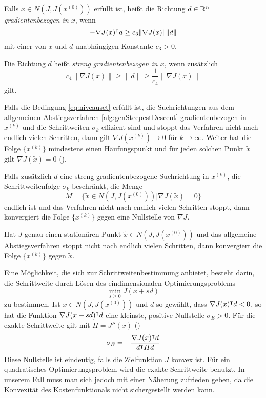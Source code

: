Falls $x\in N(J,J(x^{(0)}))$ erfüllt ist, heißt die Richtung $d\in \mathbb{R}^n$ \textit{gradientenbezogen in $x$}, wenn
 \[
  -\nabla J(x)^\intercal d\geq c_3\|\nabla J(x)\| \|d\|
 \]
mit einer von $x$ und $d$ unabhängigen Konstante $c_3>0$.

Die Richtung $d$ heißt \textit{streng gradientenbezogen in $x$}, wenn zusätzlich 
\[
 c_4\|\nabla J(x)\| \geq \|d\| \geq \frac{1}{c_4}\|\nabla J(x)\| 
\]
gilt.

Falls die Bedingung \eqref{eq:niveauset} erfüllt ist, die Suchrichtungen aus dem allgemeinen Abstiegsverfahren \ref{alg:genSteepestDescent} gradientenbezogen in $x^{(k)}$ und die Schrittweiten $\sigma_k$ effizient sind und stoppt das Verfahren nicht nach endlich vielen Schritten, dann gilt $\nabla J(x^{(k)})\to 0$ für $k\to \infty$. Weiter hat die Folge $\{x^{(k)}\}$ mindestens einen Häufungspunkt und für jeden solchen Punkt $\tilde x$ gilt $\nabla J(\tilde x) = 0$ (\cite[Satz 4.4.9]{alt2002nichtlineare}).

Falls zusätzlich $d$ eine streng gradientenbezogene Suchrichtung in $x^{(k)}$, die Schrittweitenfolge $\sigma_k$ beschränkt, die Menge 
$$M = \{\tilde x\in N(J,J(x^{(0)}))|\nabla J(\tilde x)=0\}$$ endlich ist und das Verfahren nicht nach endlich vielen Schritten stoppt, dann konvergiert die Folge $\{x^{(k)}\}$ gegen eine Nullstelle von $\nabla J$.

Hat $J$ genau einen stationären Punkt $\tilde x \in N(J,J(x^{(0)}))$ und das allgemeine Abstiegsverfahren stoppt nicht nach endlich vielen Schritten, dann konvergiert die Folge $\{x^{(k)}\}$ gegen $\tilde x$.
 
Eine Möglichkeit, die sich zur Schrittweitenbestimmung anbietet, besteht darin, die Schrittweite durch Lösen des eindimensionalen Optimierungsproblems
\[
 \min_{s\geq 0} J(x+sd)
\]
zu bestimmen. Ist $x\in N(J,J(x^{(0)}))$ und $d$ so gewählt, dass $\nabla J(x)^\intercal d <0$, so hat die Funktion $\nabla J(x+sd)^\intercal d$ eine kleinste, positive Nullstelle $\sigma_E>0$. Für die exakte Schrittweite gilt mit $H = J''(x)$ (\cite[Gleichung (4.5.5)]{alt2002nichtlineare})
\[
 \sigma_E = -\frac{\nabla J(x)^\intercal d}{d^\intercal H d}
\]
Diese Nullstelle ist eindeutig, falls die Zielfunktion $J$ konvex ist. Für ein quadratisches Optimierungsproblem wird die exakte Schrittweite benutzt. In unserem Fall muss man sich jedoch mit einer Näherung zufrieden geben, da die Konvexität des Kostenfunktionals nicht sichergestellt werden kann. 
 

